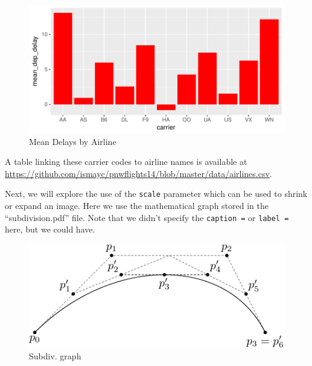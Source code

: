\documentclass[12pt,twoside]{reedthesis}
\begin{document}
  \begin{figure}[h!tbp]
  \centering
  \includegraphics[angle = 0,scale = 1]{figure/delays.pdf}
  \caption[Mean Delays by Airline]{\normalsize{Mean Delays by Airline}}
  \label{fig:delays}
  \end{figure}
  
  A table linking these carrier codes to airline names is available at
  \url{https://github.com/ismayc/pnwflights14/blob/master/data/airlines.csv}.
  
  \clearpage
  
  Next, we will explore the use of the \texttt{scale} parameter which can
  be used to shrink or expand an image. Here we use the mathematical graph
  stored in the ``subdivision.pdf'' file. Note that we didn't specify the
  \texttt{caption\ =} or \texttt{label\ =} here, but we could have.
  
  \begin{Shaded}
  \begin{Highlighting}[]
  \NormalTok{(}\NormalTok{, }\NormalTok{, }\NormalTok{, }
         \NormalTok{)}
  \end{Highlighting}
  \end{Shaded}
  
  \begin{figure}[h!tbp]
  \centering
  \includegraphics[angle = 0,scale = 0.75]{figure/subdivision.pdf}
  \caption[Subdiv. graph]{\normalsize{Subdiv. graph}}
  \label{fig:subd}
  \end{figure}
  
\end{document}
